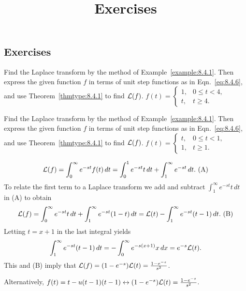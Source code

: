 \documentclass{ximera}
\title{Exercises} \license{CC BY-NC-SA 4.0}
\begin{document}
\begin{abstract}
\end{abstract}
\maketitle

\begin{onlineOnly}
\section*{Exercises}
\end{onlineOnly}

\begin{problem}\label{exer:8.4.1} 
Find the Laplace transform by
the method of Example~\ref{example:8.4.1}. Then express the given function
$f$ in terms of unit step functions as in Eqn.~\eqref{eq:8.4.6}, and use
Theorem~\ref{thmtype:8.4.1} to find ${\cal L}(f)$.
$f(t)=\left\{\begin{array}{cl} 1,&0
\le t<4,\\ t,&t\ge4.\end{array}\right.$
\end{problem}

\begin{problem}\label{exer:8.4.2} 
Find the Laplace transform by
the method of Example~\ref{example:8.4.1}. Then express the given function
$f$ in terms of unit step functions as in Eqn.~\eqref{eq:8.4.6}, and use
Theorem~\ref{thmtype:8.4.1} to find ${\cal L}(f)$.
$f(t)=\left\{\begin{array}{cl} t,&0
\le t<1,\\ 1,&t\ge1.\end{array}\right.$

\begin{solution}
$$
{\cal L}(f)  =\int_0^\infty e^{-st}f(t)\, dt
 =\int_0^1 e^{-st}t\,dt+\int_1^\infty e^{-st}\,dt.
\text{ (A)}
$$
To relate the first term to a Laplace transform we add and subtract
$\int_1^\infty e^{-st}t\, dt$
  in (A) to obtain
$$
{\cal L}(f)=\int_0^\infty e^{-st}t\,dt+
\int_1^\infty e^{-st}(1-t)\, dt
={\cal L}(t)-\int_1^\infty e^{-st}(t-1)\,dt.
\text{ (B)}
$$
Letting $t=x+1$  in the last integral yields
$$
\int_1^\infty e^{-st}(t-1)\,dt=-\int_0^\infty e^{-s(x+1)}x\,dx
 =e^{-s}{\cal L}(t).
$$
This and (B) imply that
${\cal L}(f)=(1-e^{-s}){\cal L}(t)
= \frac{1-e^{-s}}{s^2}$.

Alternatively,
$f(t)=t-u(t-1)(t-1)\leftrightarrow(1-e^{-s}){\cal
L}(t)= \frac{1-e^{-s}}{s^2}$.
\end{solution}
\end{problem}
\end{document}
